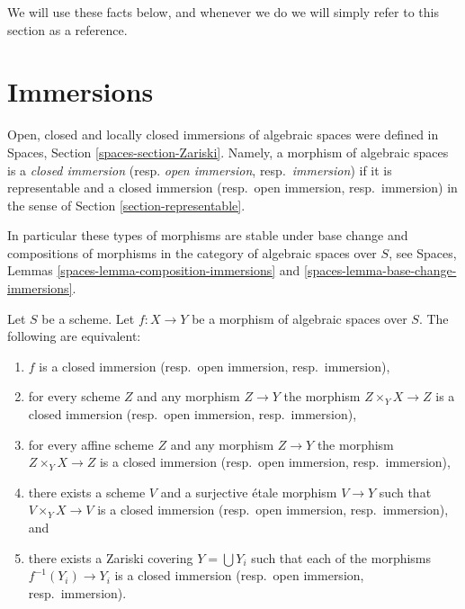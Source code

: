 \medskip\noindent
We will use these facts below, and whenever we do we will simply refer
to this section as a reference.





\section{Immersions}
\label{section-immersions}

\noindent
Open, closed and locally closed immersions of algebraic spaces were defined in
Spaces, Section \ref{spaces-section-Zariski}.
Namely, a morphism of algebraic spaces is a
{\it closed immersion} (resp. {\it open immersion}, resp.\ {\it immersion})
if it is representable and a closed immersion (resp.\ open immersion,
resp.\ immersion) in the sense of Section \ref{section-representable}.

\medskip\noindent
In particular these types of morphisms are stable under base change
and compositions of morphisms in the category of algebraic
spaces over $S$, see
Spaces, Lemmas \ref{spaces-lemma-composition-immersions} and
\ref{spaces-lemma-base-change-immersions}.

\begin{lemma}
\label{lemma-closed-immersion-local}
Let $S$ be a scheme. Let $f : X \to Y$ be a morphism of algebraic spaces
over $S$. The following are equivalent:
\begin{enumerate}
\item $f$ is a closed immersion (resp.\ open immersion, resp.\ immersion),
\item for every scheme $Z$ and any morphism $Z \to Y$ the morphism
$Z \times_Y X \to Z$ is a closed immersion (resp.\ open immersion,
resp.\ immersion),
\item for every affine scheme $Z$ and any morphism
$Z \to Y$ the morphism $Z \times_Y X \to Z$ is a closed immersion
(resp.\ open immersion, resp.\ immersion),
\item there exists a scheme $V$ and a surjective \'etale morphism
$V \to Y$ such that $V \times_Y X \to V$ is a closed immersion
(resp.\ open immersion, resp.\ immersion), and
\item there exists a Zariski covering $Y = \bigcup Y_i$ such that
each of the morphisms $f^{-1}(Y_i) \to Y_i$ is a closed immersion
(resp.\ open immersion, resp.\ immersion).
\end{enumerate}
\end{lemma}

